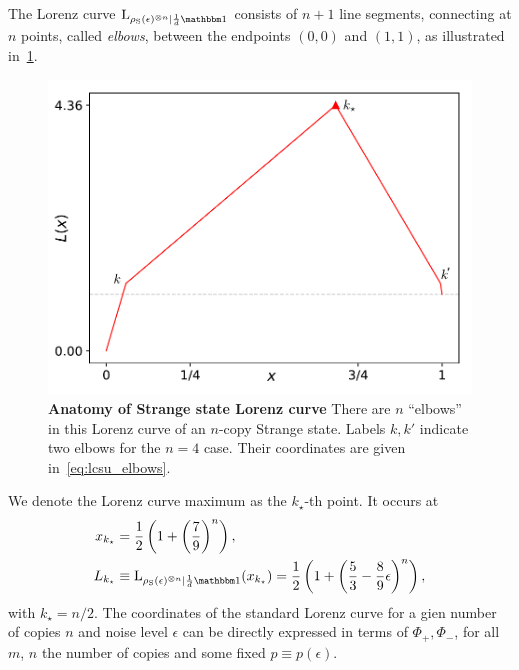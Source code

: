 \documentclass[pra,
aps,
twocolumn,
superscriptaddress,
groupedaddress,
nofootinbib,
reprint
]{revtex4-1}
\begin{document}
The Lorenz curve $\lc{\noisysn}{\frac{1}{d}\id}$ consists of $n+1$ line segments, connecting at $n$ points, called \emph{elbows}, between the endpoints $(0,0)$ and $(1,1)$, as illustrated in~\cref{fig:lcsu_elbows}. 
\begin{figure}[b]
    \centering
    \includegraphics[scale=0.5]{figs/lccalcdiagram.pdf}
    \caption{\textbf{Anatomy of Strange state Lorenz curve}
    There are $n$ ``elbows'' in this Lorenz curve of an $n$-copy Strange state.
    Labels $k, k'$ indicate two elbows for the $n=4$ case.
    Their coordinates are given in~\cref{eq:lcsu_elbows}.
    }
    \label{fig:lcsu_elbows}
\end{figure}
We denote the Lorenz curve maximum as the $k_\star$-th point.
It occurs at 
\begin{align}\label{eq:lcsu_max}
	x_{k_\star} &= \frac{1}{2}\left(1 + \left( \frac{7}{9} \right)^n \right), \\
	L_{k_\star} &\equiv \lc{\noisysn}{\frac{1}{d}\id}(x_{k_\star}) = \frac{1}{2}\left (1 + \left(\frac{5}{3}-\frac{8}{9}\epsilon\right)^n \right),
\end{align}
with $k_\star = n/2$.
The coordinates of the standard Lorenz curve for a gien number of copies $n$ and noise level $\epsilon$ can be directly expressed in terms of $\Phi_+, \Phi_-$, for all $m$, $n$ the number of copies and some fixed $p \equiv p(\epsilon)$.
\end{document}
